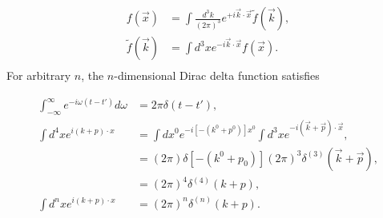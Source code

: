 \begin{equation}
	\begin{split}
		f(\vec{x})&=\int \frac{d^3k}{(2\pi)^3}e^{+i\vec{k}\cdot \vec{x}}\tilde{f}(\vec{k}),\\
		\tilde{f}(\vec{k})&=\int d^3x e^{-i\vec{k}\cdot \vec{x}}f(\vec{x}).\\
	\end{split}
\end{equation} 
For arbitrary $n$, the $n$-dimensional Dirac delta function satisfies

\begin{equation}
	\begin{split}
		\int_{-\infty}^\infty e^{-i\omega (t-t')}d\omega &=2\pi\delta(t-t'),\\
		\int d^4x e^{i(k+p)\cdot x}&=\int dx^0 e^{-i[-(k^0+p^0)]x^0}\int d^3xe^{-i(\vec{k}+\vec{p})\cdot \vec{x}},\\
		&=(2\pi)\delta[-(k^0+p_0)](2\pi)^3\delta^{(3)}(\vec{k}+\vec{p}),\\
		&=(2\pi)^4\delta^{(4)}(k+p),\\
		\int d^nx e^{i(k+p)\cdot x}&=(2\pi)^{n}\delta^{(n)}(k+p).
	\end{split}
\end{equation} 

